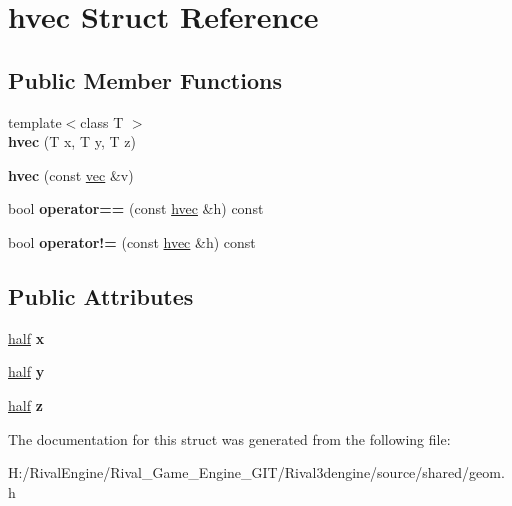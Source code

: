 \hypertarget{structhvec}{}\section{hvec Struct Reference}
\label{structhvec}
\subsection*{Public Member Functions}
\begin{DoxyCompactItemize}
\item 
\mbox{\label{structhvec_aa650da33f299cb90d066f877a3a96065}} 
{\footnotesize template$<$class T $>$ }\\{\bfseries hvec} (T x, T y, T z)
\item 
\mbox{\label{structhvec_a6fab7b143c957155f4e2697814b46760}} 
{\bfseries hvec} (const \hyperlink{structvec}{vec} \&v)
\item 
\mbox{\label{structhvec_ae51670acb58d2638e17a9738686c9582}} 
bool {\bfseries operator==} (const \hyperlink{structhvec}{hvec} \&h) const
\item 
\mbox{\label{structhvec_aa7ed4f97334561babfd9c1b4f2c1e3d5}} 
bool {\bfseries operator!=} (const \hyperlink{structhvec}{hvec} \&h) const
\end{DoxyCompactItemize}
\subsection*{Public Attributes}
\begin{DoxyCompactItemize}
\item 
\mbox{\label{structhvec_a0111d3ac72a5cd332a3a2e48b9d37dba}} 
\hyperlink{structhalf}{half} {\bfseries x}
\item 
\mbox{\label{structhvec_aa5026a756662397dbf79f86fee25842e}} 
\hyperlink{structhalf}{half} {\bfseries y}
\item 
\mbox{\label{structhvec_a856b4204264a20cbe2a579a61ce63561}} 
\hyperlink{structhalf}{half} {\bfseries z}
\end{DoxyCompactItemize}


The documentation for this struct was generated from the following file\+:\begin{DoxyCompactItemize}
\item 
H\+:/\+Rival\+Engine/\+Rival\+\_\+\+Game\+\_\+\+Engine\+\_\+\+G\+I\+T/\+Rival3dengine/source/shared/geom.\+h\end{DoxyCompactItemize}
